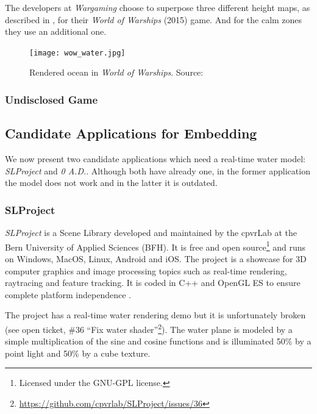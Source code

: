 The developers at \textit{Wargaming} choose to superpose three different height
maps, as described in \autocite[Chapter~18]{pharr2005gpu}
\autocite{kryachko2016sea}, for their \textit{World of Warships} (2015) game.
And for the calm zones they use an additional one. 


\begin{figure}[h]
    \centering
    \texttt{[image: wow\_water.jpg]}
    \caption{Rendered ocean in \textit{World of Warships}. Source:
    \autocite{kryachko2016sea}}\label{fig:wow_sea}
\end{figure}

\subsubsection{Undisclosed Game}\label{subsub:undisclosed_game}

\subsection{Candidate Applications for Embedding}\label{subsec:candidate_apps}

We now present two candidate applications which need a real-time water model:
\textit{SLProject} and \textit{0 A.D.}. Although both have already one,
in the former application the model does not work and in the latter it is
outdated.


\subsubsection{SLProject}

\textit{SLProject} is a Scene Library developed and maintained by the cpvrLab at
the Bern University of Applied Sciences (BFH). It is free and open
source\footnote{Licensed under the GNU-GPL license.} and runs on Windows, MacOS,
Linux, Android and iOS\@. The project is a showcase for 3D computer graphics and
image processing topics such as real-time rendering, raytracing and feature
tracking. It is coded in C++ and OpenGL ES to ensure complete platform
independence \autocite{hudritch2017slproject, slproject2017doxygen}.

The project has a real-time water rendering demo but it is unfortunately broken
(see open ticket, \#36 ``Fix water
shader''\footnote{\url{https://github.com/cpvrlab/SLProject/issues/36}}). The
water plane is modeled by a simple multiplication of the sine and cosine
functions and is illuminated 50\% by a point light and 50\% by a cube texture.


